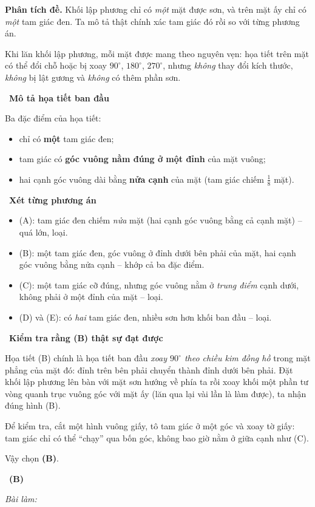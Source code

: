\documentclass[11pt]{article}
\newif\ifsol \solfalse
\providecommand{\AnsWord}{Đáp số}
\newcommand{\ans}[1]{\par\smallskip{\bfseries\color{tmGreen!88!black}\AnsWord:}\ {\bfseries\color{AnsRed}#1}\par}
\newcommand{\probsol}[1]{%
  \begin{lrbox}{\solmeasure}\begin{minipage}{\dimexpr\linewidth-24pt\relax}#1\end{minipage}\end{lrbox}%
  \ifsol
    \begin{solbox}#1\end{solbox}%
  \else
    \setlength{\solht}{\dimexpr\ht\solmeasure+\dp\solmeasure+0.85cm\relax}%
    \ifdim\solht<1.35cm\setlength{\solht}{1.35cm}\fi
    \ifdim\solht>\StudentMaxWork\setlength{\solht}{\StudentMaxWork}\fi
    \begin{tcolorbox}[colback=white,colframe=Line,boxrule=0.8pt,arc=5pt,
      left=8pt,right=8pt,top=4pt,bottom=4pt,height=\solht]{\footnotesize\color{Slate}\itshape\WorkWord}\end{tcolorbox}%
  \fi}
\newlength{\StudentMaxWork}\setlength{\StudentMaxWork}{7.5cm}
\newcommand{\step}[2]{\par\smallskip\noindent{\bfseries\color{tmBlue!85!black}\StepWord~#1.}\ {\bfseries #2}\par\nopagebreak}
\def\WorkWord{Bài làm:}
\def\AnsWord{Đáp số}
\def\StepWord{Bước}
\begin{document}
\probsol{
\textbf{Phân tích đề.} Khối lập phương chỉ có \emph{một} mặt được sơn, và trên mặt ấy chỉ có \emph{một} tam giác đen. Ta mô tả thật chính xác tam giác đó rồi so với từng phương án.
\begin{recallbox}Khi lăn khối lập phương, mỗi mặt được mang theo nguyên vẹn: họa tiết trên mặt có thể đổi chỗ hoặc bị xoay $90^\circ$, $180^\circ$, $270^\circ$, nhưng \emph{không} thay đổi kích thước, \emph{không} bị lật gương và \emph{không} có thêm phần sơn.\end{recallbox}
\step{1}{Mô tả họa tiết ban đầu}
Ba đặc điểm của họa tiết:
\begin{itemize}[leftmargin=1.3em,itemsep=0pt,topsep=0pt]
  \item chỉ có \textbf{một} tam giác đen;
  \item tam giác có \textbf{góc vuông nằm đúng ở một đỉnh} của mặt vuông;
  \item hai cạnh góc vuông dài bằng \textbf{nửa cạnh} của mặt (tam giác chiếm $\frac18$ mặt).
\end{itemize}

\step{2}{Xét từng phương án}
\begin{itemize}[leftmargin=1.3em,itemsep=1pt,topsep=0pt]
  \item (A): tam giác đen chiếm \emph{nửa} mặt (hai cạnh góc vuông bằng cả cạnh mặt) -- quá lớn, loại.
  \item (B): một tam giác đen, góc vuông ở đỉnh dưới bên phải của mặt, hai cạnh góc vuông bằng nửa cạnh -- khớp cả ba đặc điểm.
  \item (C): một tam giác cỡ đúng, nhưng góc vuông nằm ở \emph{trung điểm} cạnh dưới, không phải ở một đỉnh của mặt -- loại.
  \item (D) và (E): có \emph{hai} tam giác đen, nhiều sơn hơn khối ban đầu -- loại.
\end{itemize}

\step{3}{Kiểm tra rằng (B) thật sự đạt được}
Họa tiết (B) chính là họa tiết ban đầu \emph{xoay $90^\circ$ theo chiều kim đồng hồ} trong mặt phẳng của mặt đó: đỉnh trên bên phải chuyển thành đỉnh dưới bên phải. Đặt khối lập phương lên bàn với mặt sơn hướng về phía ta rồi xoay khối một phần tư vòng quanh trục vuông góc với mặt ấy (lăn qua lại vài lần là làm được), ta nhận đúng hình (B).
\begin{tipbox}Để kiểm tra, cắt một hình vuông giấy, tô tam giác ở một góc và xoay tờ giấy: tam giác chỉ có thể ``chạy'' qua bốn góc, không bao giờ nằm ở giữa cạnh như (C).\end{tipbox}
Vậy chọn \textbf{(B)}.
\ans{(B)}
}
\end{document}

